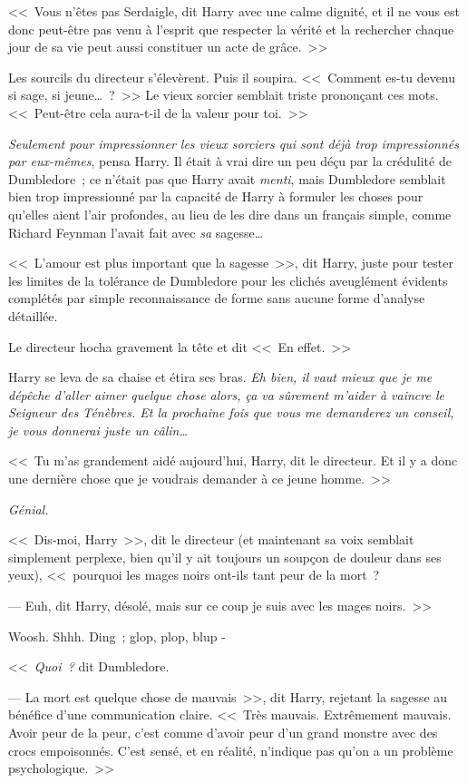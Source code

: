<<~Vous n'êtes pas Serdaigle, dit Harry avec une calme dignité, et il ne vous est donc peut-être pas venu à l'esprit que respecter la vérité et la rechercher chaque jour de sa vie peut aussi constituer un acte de grâce.~>>

Les sourcils du directeur s'élevèrent. Puis il soupira. <<~Comment es-tu devenu si sage, si jeune…~?~>> Le vieux sorcier semblait triste prononçant ces mots. <<~Peut-être cela aura-t-il de la valeur pour toi.~>>

\emph{Seulement pour impressionner les vieux sorciers qui sont déjà trop impressionnés par eux-mêmes}, pensa Harry. Il était à vrai dire un peu déçu par la crédulité de Dumbledore~; ce n'était pas que Harry avait \emph{menti}, mais Dumbledore semblait bien trop impressionné par la capacité de Harry à formuler les choses pour qu'elles aient l'air profondes, au lieu de les dire dans un français simple, comme Richard Feynman l'avait fait avec \emph{sa} sagesse…

<<~L'amour est plus important que la sagesse~>>, dit Harry, juste pour tester les limites de la tolérance de Dumbledore pour les clichés aveuglément évidents complétés par simple reconnaissance de forme sans aucune forme d'analyse détaillée.

Le directeur hocha gravement la tête et dit <<~En effet.~>>

Harry se leva de sa chaise et étira ses bras. \emph{Eh bien, il vaut mieux que je me dépêche d'aller aimer quelque chose alors, ça va sûrement m'aider à vaincre le Seigneur des Ténèbres. Et la prochaine fois que vous me demanderez un conseil, je vous donnerai juste un câlin…}

<<~Tu m'as grandement aidé aujourd'hui, Harry, dit le directeur. Et il y a donc une dernière chose que je voudrais demander à ce jeune homme.~>>

\emph{Génial.}

<<~Dis-moi, Harry~>>, dit le directeur (et maintenant sa voix semblait simplement perplexe, bien qu'il y ait toujours un soupçon de douleur dans ses yeux), <<~pourquoi les mages noirs ont-ils tant peur de la mort~?

--- Euh, dit Harry, désolé, mais sur ce coup je suis avec les mages noirs.~>>

Woosh. Shhh. Ding~; glop, plop, blup -

<<~\emph{Quoi~?} dit Dumbledore.

--- La mort est quelque chose de mauvais~>>, dit Harry, rejetant la sagesse au bénéfice d'une communication claire. <<~Très mauvais. Extrêmement mauvais. Avoir peur de la peur, c'est comme d'avoir peur d'un grand monstre avec des crocs empoisonnés. C'est sensé, et en réalité, n'indique pas qu'on a un problème psychologique.~>>

